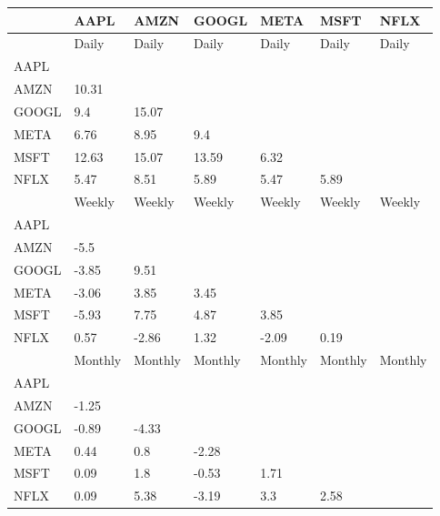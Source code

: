 \begin{tabular}{lllllll}
\toprule
{} &     AAPL &     AMZN &    GOOGL &     META &     MSFT &     NFLX \\
\midrule
      &    Daily &    Daily &    Daily &    Daily &    Daily &    Daily \\
AAPL  &          &          &          &          &          &          \\
AMZN  &    10.31 &          &          &          &          &          \\
GOOGL &      9.4 &    15.07 &          &          &          &          \\
META  &     6.76 &     8.95 &      9.4 &          &          &          \\
MSFT  &    12.63 &    15.07 &    13.59 &     6.32 &          &          \\
NFLX  &     5.47 &     8.51 &     5.89 &     5.47 &     5.89 &          \\
      &   Weekly &   Weekly &   Weekly &   Weekly &   Weekly &   Weekly \\
AAPL  &          &          &          &          &          &          \\
AMZN  &     -5.5 &          &          &          &          &          \\
GOOGL &    -3.85 &     9.51 &          &          &          &          \\
META  &    -3.06 &     3.85 &     3.45 &          &          &          \\
MSFT  &    -5.93 &     7.75 &     4.87 &     3.85 &          &          \\
NFLX  &     0.57 &    -2.86 &     1.32 &    -2.09 &     0.19 &          \\
      &  Monthly &  Monthly &  Monthly &  Monthly &  Monthly &  Monthly \\
AAPL  &          &          &          &          &          &          \\
AMZN  &    -1.25 &          &          &          &          &          \\
GOOGL &    -0.89 &    -4.33 &          &          &          &          \\
META  &     0.44 &      0.8 &    -2.28 &          &          &          \\
MSFT  &     0.09 &      1.8 &    -0.53 &     1.71 &          &          \\
NFLX  &     0.09 &     5.38 &    -3.19 &      3.3 &     2.58 &          \\
\bottomrule
\end{tabular}
